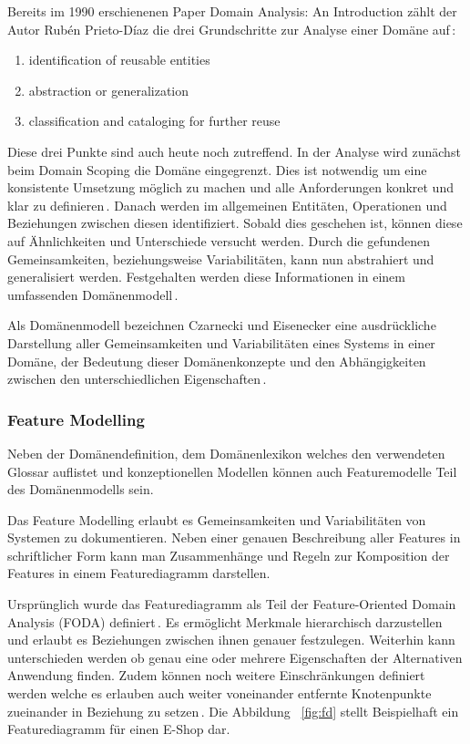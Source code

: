 \documentclass[12pt,oneside,a4paper,parskip]{scrbook}
\begin{document}
Bereits im 1990 erschienenen Paper Domain Analysis: An Introduction zählt der Autor Rubén Prieto-Díaz die drei Grundschritte zur Analyse einer Domäne auf\,\cite{prieto1990}:

\begin{enumerate}[itemsep=-10pt]
	\item identification of reusable entities 
	\item abstraction or generalization 
	\item classification and cataloging for further reuse
\end{enumerate}

Diese drei Punkte sind auch heute noch zutreffend. In der Analyse wird zunächst beim Domain Scoping die Domäne eingegrenzt. Dies ist notwendig um eine konsistente Umsetzung möglich zu machen und alle Anforderungen konkret und klar zu definieren\,\cite[S. 239]{stahl2007}. Danach werden im allgemeinen Entitäten, Operationen und Beziehungen zwischen diesen identifiziert. Sobald dies geschehen ist, können diese auf Ähnlichkeiten und Unterschiede versucht werden. Durch die gefundenen Gemeinsamkeiten, beziehungsweise Variabilitäten, kann nun abstrahiert und generalisiert werden. Festgehalten werden diese Informationen in einem umfassenden Domänenmodell\,\cite[S. 24ff.]{czaeis2000}.

Als Domänenmodell bezeichnen Czarnecki und Eisenecker eine ausdrückliche Darstellung aller Gemeinsamkeiten und Variabilitäten eines Systems in einer Domäne, der Bedeutung dieser Domänenkonzepte und den Abhängigkeiten zwischen den unterschiedlichen Eigenschaften\,\cite[S. 23f.]{czaeis2000}.

\subsubsection{Feature Modelling}

Neben der Domänendefinition, dem Domänenlexikon welches den verwendeten Glossar auflistet und konzeptionellen Modellen können auch Featuremodelle Teil des Domänenmodells sein. 

Das Feature Modelling erlaubt es Gemeinsamkeiten und Variabilitäten von Systemen zu dokumentieren. Neben einer genauen Beschreibung aller Features in schriftlicher Form kann man Zusammenhänge und Regeln zur Komposition der Features in einem Featurediagramm darstellen.

Ursprünglich wurde das Featurediagramm als Teil der Feature-Oriented Domain Analysis (FODA) definiert\,\cite{kang1990}. Es ermöglicht Merkmale hierarchisch darzustellen und erlaubt es Beziehungen zwischen ihnen genauer festzulegen. Weiterhin kann unterschieden werden ob genau eine oder mehrere Eigenschaften der Alternativen Anwendung finden. Zudem können noch weitere Einschränkungen definiert werden welche es erlauben auch weiter voneinander entfernte Knotenpunkte zueinander in Beziehung zu setzen\,\cite[S. 240f.]{stahl2007}. Die Abbildung ~\ref{fig:fd} stellt Beispielhaft ein Featurediagramm für einen E-Shop dar.
\end{document}
